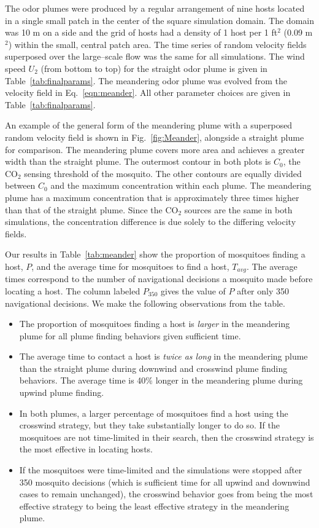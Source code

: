 \documentclass[10pt]{article}
\begin{document}
			
			The odor plumes were produced by a regular arrangement of nine hosts located in a single small patch in the center of the square simulation domain. The domain was 10 m on a side and the grid of hosts had a density of 1 host per 1 ft$^2$ (0.09 m$^2$) within the small, central patch area.  The time series of random velocity fields superposed over the large--scale flow was the same for all simulations. The wind speed $U_2$ (from bottom to top) for the straight odor plume is given in Table~\ref{tab:finalparams}.  The meandering odor plume was evolved from the velocity field in Eq.~\eqref{eqn:meander}. All other parameter choices are given in Table~\ref{tab:finalparams}. 
			
			An example of the general form of the meandering plume with a superposed random velocity field is shown in Fig.~\ref{fig:Meander}, alongside a straight plume for comparison. The meandering plume covers more area and achieves a greater width than the straight plume. The outermost contour in both plots is $C_0$, the CO$_2$ sensing threshold of the mosquito. The other contours are equally divided between $C_0$ and the maximum concentration within each plume. The meandering plume has a maximum concentration that is approximately three times higher than that of the straight plume. Since the CO$_2$ sources are the same in both simulations, the concentration difference is due solely to the differing velocity fields.

				Our results in Table~\ref{tab:meander} show the proportion of mosquitoes finding a host, $P$, and the average time for mosquitoes to find a host, $T_{avg}$. The average times correspond to the number of navigational decisions a mosquito made before locating a host. The column labeled $P_{350}$ gives the value of $P$ after only 350 navigational decisions. We make the following observations from the table.
		\begin{itemize}
			\item The proportion of mosquitoes finding a host is \textit{larger} in the meandering plume for all plume finding behaviors given sufficient time.
			\item The average time to contact a host is \textit{twice as long} in the meandering plume than the straight plume during downwind and crosswind plume finding behaviors. The average time is 40\% longer in the meandering plume during upwind plume finding.
			\item In both plumes, a larger percentage of mosquitoes find a host using the crosswind strategy, but they take substantially longer to do so. If the mosquitoes are not time-limited in their search, then the crosswind strategy is the most effective in locating hosts.
			\item If the mosquitoes were time-limited and the simulations were stopped after 350 mosquito decisions (which is sufficient time for all upwind and downwind cases to remain unchanged), the crosswind behavior goes from being the most effective strategy to being the least effective strategy in the meandering plume.
		\end{itemize}
		
\end{document}
